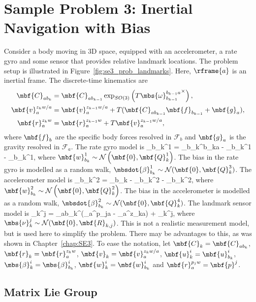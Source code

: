 \section{\NoAutoSpacing Sample Problem 3: Inertial Navigation with Bias}
\label{sec:se23b}

Consider a body moving in 3D space, equipped with an accelerometer, a rate gyro and some sensor that provides relative landmark locations. The problem setup is illustrated in Figure~\ref{fig:se3_prob_landmarks}. Here, $\rframe{a}$ is an inertial frame. The discrete-time kinematics are
\begin{align*}
	\mbf{C}_{ab_k} &= \mbf{C}_{ab_{k-1}}\exp_{SO(3)}\left(T{\mbs{\omega}_{b_{k-1}}^{b_{k-1}a}}^\times\right), \\
	\mbf{v}_a^{z_kw/a} &= \mbf{v}_a^{z_{k-1}w/a} + T(\mbf{C}_{ab_{k-1}}\mbf{f}_{b_{k-1}} + \mbf{g}_a), \\
	\mbf{r}_a^{z_kw} &= \mbf{r}_a^{z_{k-1}w} + T\mbf{v}_a^{z_{k-1}w/a}, 
\end{align*}
where $\mbf{f}_b$ are the specific body forces resolved in $\mathcal{F}_b$ and $\mbf{g}_a$ is the gravity resolved in $\mathcal{F}_a$. The rate gyro model is
\bdis
	_{b_k}^1 = \mbs{\omega}_{b_k}^{b_ka} - \mbs{\beta}_{b_k}^1 - _{b_k}^1,
\edis
where $\mbf{w}_{b_k}^1 \sim \mathcal{N}\left(\mbf{0},\mbf{Q}_k^1\right)$. The bias in the rate gyro is modelled as a random walk, $\mbsdot{\beta}_{b_k}^1 \sim \mathcal{N}(\mbf{0},\mbf{Q}_k^3)$. 
The accelerometer model is 
\bdis
	_{b_k}^2 = _{b_k} - \mbs{\beta}_{b_k}^2 - _{b_k}^2,
\edis
where $\mbf{w}^2_{b_k} \sim \mathcal{N}\left(\mbf{0},\mbf{Q}_k^2\right)$. The bias in the accelerometer is modelled as a random walk, $\mbsdot{\beta}_{b_k}^2 \sim \mathcal{N}(\mbf{0},\mbf{Q}_k^4)$. 
The landmark sensor model is
\bdis
	_k^j = _{ab_k}^\trans\left(_{a}^{p_ja} - _{a}^{z_ka}\right) + \mbs{\nu}_k^j,
\edis
where $\mbs{\nu}_k^j \sim \mathcal{N}(\mbf{0},\mbf{R}_{k,j})$. This is not a realistic measurement model, but is used here to simplify the problem. There may be advantages to this, as was shown in Chapter~\ref{chap:SE3}. To ease the notation, let $\mbf{C}_k = \mbf{C}_{ab_k}$, $\mbf{r}_k = \mbf{r}_a^{z_kw}$, $\mbf{v}_k = \mbf{v}_{a}^{z_kw/a}$, $\mbf{u}_k^i = \mbf{u}_{b_k}^i$, $\mbs{\beta}_k^i = \mbs{\beta}_{b_k}^i$,  $\mbf{w}_k^i = \mbf{w}_{b_k}^i$ and $\mbf{r}_{a}^{p_jw} = \mbf{p}^j$.

\subsection{Matrix Lie Group}

